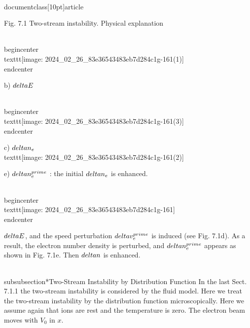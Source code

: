 \\documentclass[10pt]{article}
\begin{document}
{{{{Fig. 7.1 Two-stream instability. Physical explanation

\\begin{center}
\\texttt{[image: 2024\_02\_26\_83e36543483eb7d284c1g-161(1)]}
\\end{center}

b) $\\delta E$

\\begin{center}
\\texttt{[image: 2024\_02\_26\_83e36543483eb7d284c1g-161(3)]}
\\end{center}

c) $\\delta n_{e}$
\\texttt{[image: 2024\_02\_26\_83e36543483eb7d284c1g-161(2)]}

e) $\\delta n_{e}^{\\prime}$ : the initial $\\delta n_{e}$ is enhanced.

\\begin{center}
\\texttt{[image: 2024\_02\_26\_83e36543483eb7d284c1g-161]}
\\end{center}

$\\delta E$, and the speed perturbation $\\delta v_{e}^{\\prime}$ is induced (see Fig. 7.1d). As a result, the electron number density is perturbed, and $\\delta n_{e}^{\\prime}$ appears as shown in Fig. 7.1e. Then $\\delta n$ is enhanced.

\\subsubsection*{Two-Stream Instability by Distribution Function}
In the last Sect. 7.1.1 the two-stream instability is considered by the fluid model. Here we treat the two-stream instability by the distribution function microscopically. Here we assume again that ions are rest and the temperature is zero. The electron beam moves with $V_{0}$ in $x$.

}}}}
\end{document}
